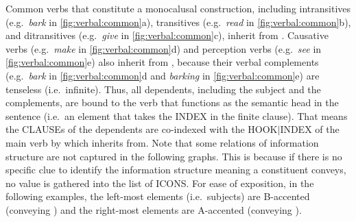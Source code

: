 Common verbs that constitute a monocalusal construction, including
intransitives (e.g.\ \textit{bark} in \ref{fig:verbal:common}a),
transitives (e.g.\ \textit{read} in \ref{fig:verbal:common}b), and
ditransitives (e.g.\ \textit{give} in \ref{fig:verbal:common}c),
inherit from . Causative verbs
(e.g.\ \textit{make} in \ref{fig:verbal:common}d) and perception verbs
(e.g.\ \textit{see} in \ref{fig:verbal:common}e) also inherit from
, because their verbal complements
(e.g.\ \textit{bark} in \ref{fig:verbal:common}d and \textit{barking}
in \ref{fig:verbal:common}e) are tenseless (i.e.\ infinite).  Thus,
all dependents, including the subject and the complements, are bound
to the verb that functions as the semantic head in the sentence
(i.e.\ an element that takes the INDEX in the finite
clause). That means the CLAUSEs of the dependents are
co-indexed with the HOOK{$\mid$}INDEX of the main verb by
  which
 inherits from.  Note that some relations
of information structure are not captured in the following
graphs. This is because if there is no specific clue to identify the
information structure meaning a constituent conveys, no value is
gathered into the list of ICONS. For ease of exposition, in the
following examples, the left-most elements (i.e.\ subjects) are
B-accented (conveying ) and the right-most
elements are A-accented (conveying
).


